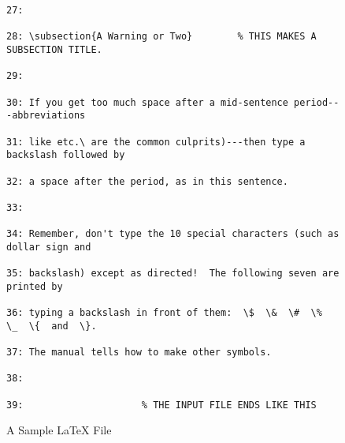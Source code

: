 \begin{figure}
{\begin{verbatim}
27:

28: \subsection{A Warning or Two}        % THIS MAKES A SUBSECTION TITLE.

29:

30: If you get too much space after a mid-sentence period---abbreviations

31: like etc.\ are the common culprits)---then type a backslash followed by

32: a space after the period, as in this sentence.

33:

34: Remember, don't type the 10 special characters (such as dollar sign and

35: backslash) except as directed!  The following seven are printed by

36: typing a backslash in front of them:  \$  \&  \#  \%  \_  \{  and  \}.

37: The manual tells how to make other symbols.

38:

39:                     % THE INPUT FILE ENDS LIKE THIS

\end{verbatim}  }



\caption{A Sample \LaTeX{} File}\label{fig:sample}



\end{figure} %



